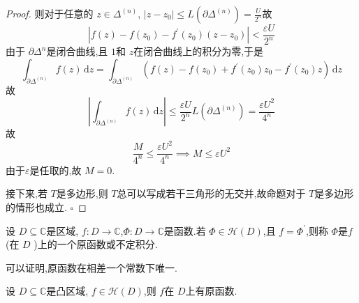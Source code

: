 \documentclass[../../复变函数.tex]{subfiles}
\begin{document}
\begin{proof}
    则对于任意的 \(  z \in  \Delta ^{\left( n \right) }  \), \(  \left| z-z_0 \right|\le L\left( \partial  \Delta ^{\left( n \right) } \right)= \frac{U }{2^{n} }     \)故 \[
    \left| f\left( z \right)-f\left( z_0 \right)-f^{\prime} \left( z_0 \right)\left( z-z_0 \right)     \right|< \frac{ \varepsilon U }{2^{n} }  
    \] 由于 \(  \partial  \Delta ^{n}  \)是闭合曲线,且 \(  1  \)和 \(  z  \)在闭合曲线上的积分为零,于是   \[
    \int_{\partial  \Delta ^{\left( n \right) }}f\left( z \right)\,\mathrm{d} z= \int_{\partial  \Delta ^{\left( n \right) }}\left( f\left( z \right)-f\left( z_0 \right)+ f^{\prime} \left( z_0 \right)z_0-f^{\prime} \left( z_0 \right)z     \right)\,\mathrm{d} z  
    \]       故 \[
    \left| \int_{\partial  \Delta ^{\left( n \right) }}f\left( z \right)\,\mathrm{d} z  \right|\le \frac{ \varepsilon U }{2^{n} }L\left( \partial  \Delta ^{\left( n \right) } \right)=  \frac{ \varepsilon U^{2} }{4^{n} }    
    \]故 \[
    \frac{M }{4^{n} }\le \frac{ \varepsilon U^{2} }{4^{n} }\implies  M \le  \varepsilon U^{2}  
    \]由于\(   \varepsilon   \)是任取的,故 \(  M= 0  \).
    
    
    接下来,若 \(  T  \)是多边形,则 \(  T  \)总可以写成若干三角形的无交并,故命题对于 \(  T  \)是多边形的情形也成立.   
    \hfill $\square$
\end{proof}




\begin{definition}
    设 \(  D\subseteq \mathbb{C}   \)是区域, \(  f:D\to \mathbb{C}   \),\(  \Phi :D\to \mathbb{C}   \)是函数.若 \(  \Phi  \in \mathcal{H}\left( D \right)   \),且 \(  f = \Phi ^{\prime}   \),则称 \(  \Phi   \)是\(  f  \)(在 \(  D  \) )上的一个原函数或不定积分.       
\end{definition}
\begin{remark}
    可以证明,原函数在相差一个常数下唯一.
\end{remark}

\begin{lemma}
    设 \(  D\subseteq \mathbb{C}   \)是凸区域, \(  f \in \mathcal{H}\left( D \right)   \),则 \(  f  \)在 \(  D  \)上有原函数.    
\end{lemma}
\end{document}
